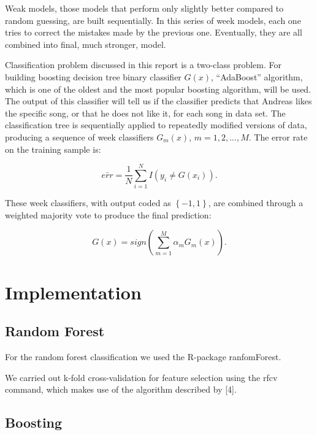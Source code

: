 \documentclass{article}
\begin{document}
Weak models, those models that perform only slightly better compared to random guessing, are built sequentially. In this series of week models, each one tries to correct the mistakes made by the previous one. Eventually, they are all combined into final, much stronger, model. 

Classification problem discussed in this report is a two-class problem. For building boosting decision tree binary classifier $G(x)$, ``AdaBoost'' algorithm, which is one of the oldest and the most popular boosting algorithm, will be used. The output of this classifier will tell us if the classifier predicts that Andreas likes the specific song, or that he does not like it, for each song in data set. The classification tree is sequentially applied to repeatedly modified versions of data, producing a sequence of week classifiers $G_m(x)$, $m=1,2,...,M$. The error rate on the training sample is:

\begin{equation} \label{boost_error_rate}
\bar{err}=\frac{1}{N}\sum_{i=1}^{N}I(y_i\neq G(x_i)).
\end{equation}

These week classifiers, with output coded as $\left\{-1,1\right\}$, are combined through a weighted
majority vote to produce the final prediction:

\begin{equation} \label{boost_final_pred}
G(x)=sign(\sum_{m=1}^{M}\alpha_m G_m(x)).
\end{equation}

\section{Implementation}

\subsection{Random Forest}

For the random forest classification we used the R-package {\selectfont ranfomForest}.

We carried out k-fold cross-validation for feature selection using the {\selectfont rfcv} command, which makes use of the algorithm described by [4]. 

\subsection{Boosting}
\end{document}

